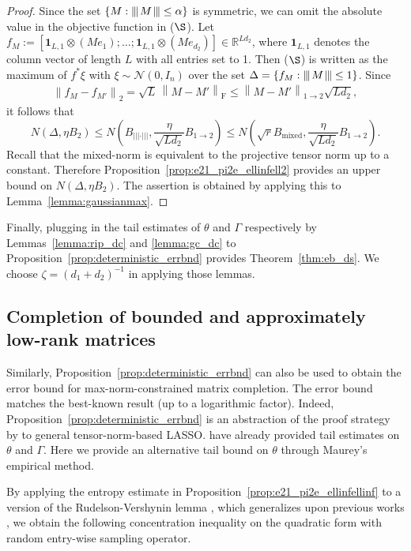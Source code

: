 \documentclass[11pt]{article}
\newcommand{\xspace}{\hbox{\kern-2.5pt}}
\newcommand\tnorm[1]{\left\vert\xspace\left\vert\xspace\left\vert\mskip2mu
#1\mskip2mu \right\vert\xspace\right\vert\xspace\right\vert}
\newcommand{\norm}[1]{\left \|#1 \right \|}
\begin{document}
\begin{proof}
Since the set $\{M: \tnorm{M} \leq \alpha\}$ is symmetric, we can omit the absolute value in the objective function in ($\S$). 
Let $f_M := [\mathbf{1}_{L,1} \otimes (M e_1) ; \dots ; \mathbf{1}_{L,1} \otimes (M e_{d_2})] \in \mathbb{R}^{Ld_2}$, where $\mathbf{1}_{L,1}$ denotes the column vector of length $L$ with all entries set to 1.
Then ($\S$) is written as the maximum of $f^* \xi$ with $\xi \sim \mathcal{N}(0,I_n)$ over the set $\Delta = \{ f_M : \tnorm{M} \leq 1 \}$.
Since 
\begin{align*}
\norm{f_M - f_{M'}}_2 
= \sqrt{L} \, \norm{M - M'}_\mathrm{F}
\leq \norm{M - M'}_{1\to 2} \sqrt{Ld_2}, 
\end{align*}
it follows that
\[
N(\Delta, \eta B_2) 
\leq N\left( B_{\vert\vert\vert\cdot\vert\vert\vert}, \frac{\eta}{\sqrt{Ld_2}}B_{1\to 2} \right)
\leq N\left( \sqrt{r} B_\mathrm{mixed}, \frac{\eta}{\sqrt{Ld_2}}B_{1\to 2} \right).
\]
Recall that the mixed-norm is equivalent to the projective tensor norm up to a constant. 
Therefore Proposition~\ref{prop:e21_pi2e_ellinfell2} provides an upper bound on $N(\Delta,\eta B_2)$. 
The assertion is obtained by applying this to Lemma~\ref{lemma:gaussianmax}.
\end{proof}

Finally, plugging in the tail estimates of $\theta$ and $\Gamma$ respectively by Lemmas~\ref{lemma:rip_dc} and \ref{lemma:gc_dc} to Proposition~\ref{prop:deterministic_errbnd} provides Theorem~\ref{thm:eb_ds}.
We choose $\zeta = (d_1+d_2)^{-1}$ in applying those lemmas. 


\subsection{Completion of bounded and approximately low-rank matrices}
\label{sec:MC}

Similarly, Proposition~\ref{prop:deterministic_errbnd} can also be used to obtain the error bound for max-norm-constrained matrix completion. 
The error bound matches the best-known result \citep{cai2016matrix} (up to a logarithmic factor).
Indeed, Proposition~\ref{prop:deterministic_errbnd} is an abstraction of the proof strategy by \citet{cai2016matrix} to general tensor-norm-based LASSO. 
\citet{cai2016matrix} have already provided tail estimates on $\theta$ and $\Gamma$. 
Here we provide an alternative tail bound on $\theta$ through Maurey's empirical method. 

By applying the entropy estimate in Proposition~\ref{prop:e21_pi2e_ellinfellinf} to a version of the Rudelson-Vershynin lemma \cite[Proposition~2.6]{junge2020generalized}, which generalizes upon previous works \citep{rudelson2008sparse,rauhut2010compressive,dirksen2015tail}, we obtain the following concentration inequality on the quadratic form with random entry-wise sampling operator.
\end{document}

